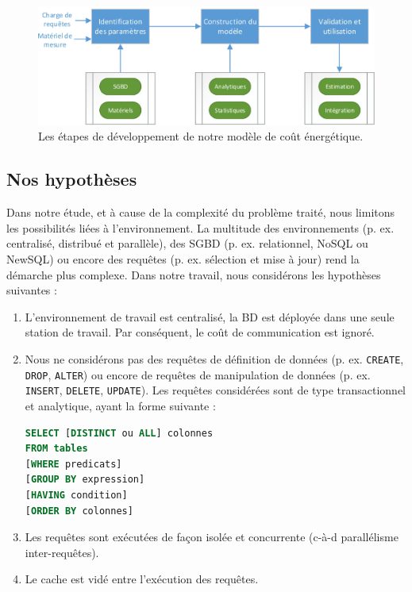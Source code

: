 \begin{figure}
 \centering
 \includegraphics[scale=0.8]{chapitre4/chap4Fig/costmodel-methodology.eps}
 \caption{Les étapes de développement de notre modèle de coût énergétique.}
 \label{fig:costmodel-methodology}
\end{figure}

\subsection{Nos hypothèses}
Dans notre étude, et à cause de la complexité du problème traité, nous limitons les possibilités liées à l'environnement. La multitude des environnements (p. ex. centralisé, distribué et parallèle), des SGBD (p. ex. relationnel, NoSQL ou NewSQL) ou encore des requêtes (p. ex. sélection et mise à jour) rend la démarche plus complexe. Dans notre travail, nous considérons les hypothèses suivantes :
\begin{enumerate}
 \item L'environnement de travail est centralisé, la BD est déployée dans une seule station de travail. Par conséquent, le coût de communication est ignoré.
 \item Nous ne considérons pas des requêtes de définition de données (p. ex. \texttt{CREATE}, \texttt{DROP}, \texttt{ALTER}) ou encore de requêtes de manipulation de données (p. ex. \texttt{INSERT}, \texttt{DELETE}, \texttt{UPDATE}). Les requêtes considérées sont de type transactionnel et analytique, ayant la forme suivante :
 \begin{lstlisting}[language=Sql]
SELECT [DISTINCT ou ALL] colonnes
FROM tables
[WHERE predicats]
[GROUP BY expression]
[HAVING condition]
[ORDER BY colonnes]
\end{lstlisting}
 \item Les requêtes sont exécutées de façon isolée et concurrente (c-à-d parallélisme inter-requêtes).
 \item Le cache est vidé entre l'exécution des requêtes.
\end{enumerate}


